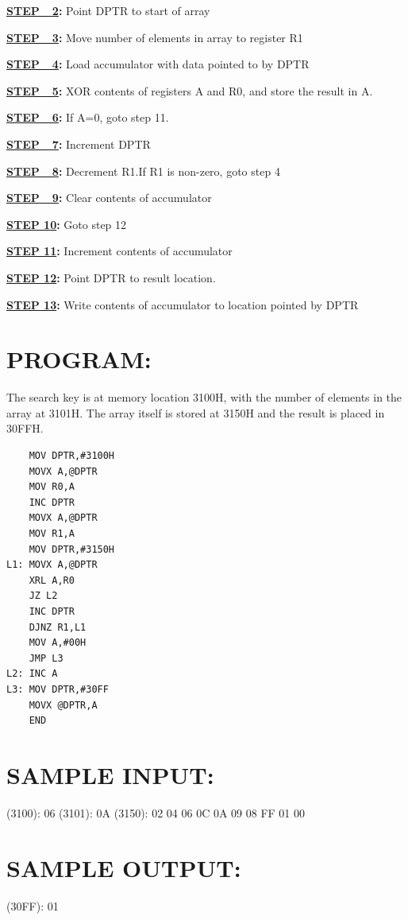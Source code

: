 \documentclass[a4paper,28pt]{report}
\begin{document}
\textbf{\underline{STEP\ \ 2}:}  Point DPTR to start of array

\textbf{\underline{STEP\ \ 3}:}  Move number of elements in array to register R1

\textbf{\underline{STEP\ \ 4}:}  Load accumulator with data pointed to by DPTR

\textbf{\underline{STEP\ \ 5}:}  XOR contents of registers A and R0, and store the result in A.

\textbf{\underline{STEP\ \ 6}:}  If A=0, goto step 11.

\textbf{\underline{STEP\ \ 7}:}  Increment DPTR

\textbf{\underline{STEP\ \ 8}:}  Decrement R1.If R1 is non-zero, goto step 4

\textbf{\underline{STEP\ \ 9}:}  Clear contents of accumulator

\textbf{\underline{STEP 10}:} Goto step 12

\textbf{\underline{STEP 11}:} Increment contents of accumulator

\textbf{\underline{STEP 12}:} Point DPTR to result location.

\textbf{\underline{STEP 13}:} Write contents of accumulator to location pointed by DPTR

\section*{PROGRAM:}
The search key is at memory location 3100H, with the number of elements in the array at 3101H. The array itself is stored at 3150H and the result is placed in 30FFH.\newline
\begin{lstlisting}
    MOV DPTR,#3100H
    MOVX A,@DPTR
    MOV R0,A
    INC DPTR
    MOVX A,@DPTR
    MOV R1,A
    MOV DPTR,#3150H
L1: MOVX A,@DPTR
    XRL A,R0
    JZ L2
    INC DPTR
    DJNZ R1,L1
    MOV A,#00H
    JMP L3
L2: INC A
L3: MOV DPTR,#30FF
    MOVX @DPTR,A
    END
\end{lstlisting}
\section*{SAMPLE INPUT:}
(3100): 06\newline
(3101): 0A\newline
(3150): 02 04 06 0C 0A 09 08 FF 01 00
\section*{SAMPLE OUTPUT:}
(30FF): 01
\end{document}
